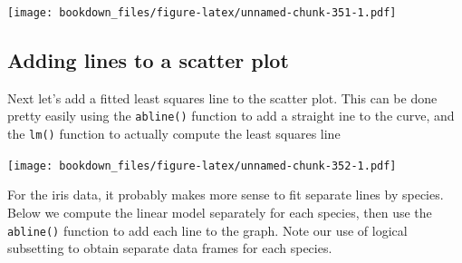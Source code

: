 \documentclass[
]{krantz}
\makeatletter
\newenvironment{Shaded}{\begin{snugshade}}{\end{snugshade}}
\newcommand{\DataTypeTok}[1]{\textcolor[rgb]{0.27,0.27,0.27}{#1}}
\newcommand{\DecValTok}[1]{\textcolor[rgb]{0.06,0.06,0.06}{#1}}
\newcommand{\FloatTok}[1]{\textcolor[rgb]{0.06,0.06,0.06}{#1}}
\newcommand{\KeywordTok}[1]{\textcolor[rgb]{0.27,0.27,0.27}{\textbf{#1}}}
\newcommand{\NormalTok}[1]{#1}
\newcommand{\OperatorTok}[1]{\textcolor[rgb]{0.43,0.43,0.43}{\textbf{#1}}}
\newcommand{\StringTok}[1]{\textcolor[rgb]{0.5,0.5,0.5}{#1}}
\newenvironment{kframe}{%
\medskip{}
\setlength{\fboxsep}{.8em}
 \def\at@end@of@kframe{}%
 \ifinner\ifhmode%
  \def\at@end@of@kframe{\end{minipage}}%
  \begin{minipage}{\columnwidth}%
 \fi\fi%
 \def\FrameCommand##1{\hskip\@totalleftmargin \hskip-\fboxsep
 \colorbox{shadecolor}{##1}\hskip-\fboxsep
     \hskip-\linewidth \hskip-\@totalleftmargin \hskip\columnwidth}%
 \MakeFramed {\advance\hsize-\width
   \@totalleftmargin\z@ \linewidth\hsize
   \@setminipage}}%
 {\par\unskip\endMakeFramed%
 \at@end@of@kframe}
\renewenvironment{Shaded}{\begin{kframe}}{\end{kframe}}
\makeatother
\begin{document}
\texttt{[image: bookdown\_files/figure-latex/unnamed-chunk-351-1.pdf]}

\hypertarget{graphics2}{%
\subsection{Adding lines to a scatter plot}\label{graphics2}}

Next let's add a fitted least squares line to the scatter plot. This can be done pretty easily using the \texttt{abline()} function to add a straight ine to the curve, and the \texttt{lm()} function to actually compute the least squares line

\begin{Shaded}
\end{Shaded}

\texttt{[image: bookdown\_files/figure-latex/unnamed-chunk-352-1.pdf]}

For the iris data, it probably makes more sense to fit separate lines by species. Below we compute the linear model separately for each species, then use the \texttt{abline()} function to add each line to the graph. Note our use of logical subsetting to obtain separate data frames for each species.
\end{document}
